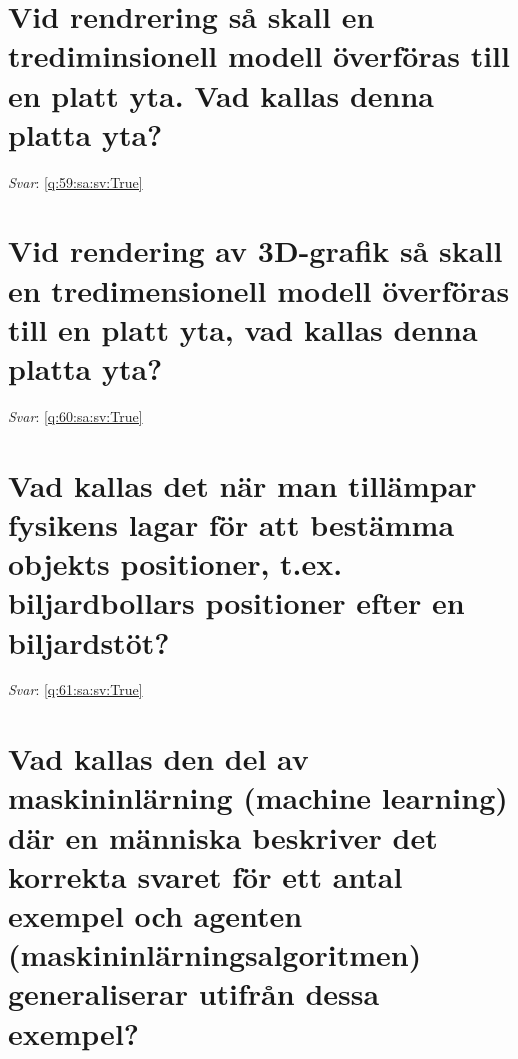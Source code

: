 \documentclass[a4paper,11pt,oneside]{book}
\begin{document}
\begin{sloppypar}
\section{Vid rendrering s\r{a} skall en trediminsionell modell \"overf\"oras till en platt yta. Vad kallas denna platta yta?}

\label{q:59:sa:sv:False}

\vspace{2cm}

\noindent\makebox[\textwidth]{\hrulefill}

\vspace{1cm}

\textit{Svar}: \autoref{q:59:sa:sv:True}



\section{Vid rendering av 3D-grafik s\r{a} skall en tredimensionell modell \"overf\"oras till en platt yta, vad kallas denna platta yta?}

\label{q:60:sa:sv:False}

\vspace{2cm}

\noindent\makebox[\textwidth]{\hrulefill}

\vspace{1cm}

\textit{Svar}: \autoref{q:60:sa:sv:True}



\section{Vad kallas det n\"ar man till\"ampar fysikens lagar f\"or att best\"amma objekts positioner, t.ex. biljardbollars positioner efter en biljardst\"ot?}

\label{q:61:sa:sv:False}

\vspace{2cm}

\noindent\makebox[\textwidth]{\hrulefill}

\vspace{1cm}

\textit{Svar}: \autoref{q:61:sa:sv:True}



\section{Vad kallas den del av maskininl\"arning (machine learning) d\"ar en m\"anniska beskriver det korrekta svaret f\"or ett antal exempel och agenten (maskininl\"arningsalgoritmen) generaliserar utifr\r{a}n dessa exempel?}


\end{sloppypar}
\end{document}
